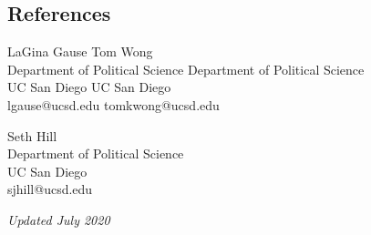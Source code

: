\documentclass[margin, line]{res}
\begin{document}
\begin{resume}
\newpage

\section{References} LaGina Gause \hfill Tom Wong\\
Department of Political Science \hfill Department of Political Science\\
UC San Diego \hfill UC San Diego\\
lgause@ucsd.edu \hfill tomkwong@ucsd.edu

Seth Hill\\
Department of Political Science\\
UC San Diego\\
sjhill@ucsd.edu

\small{\textit{Updated July 2020}}

\end{resume}
\end{document}
